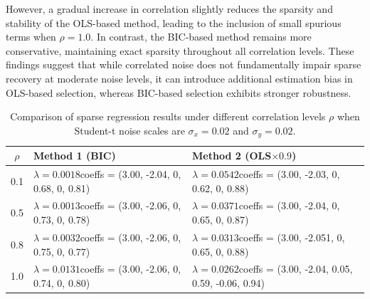 However, a gradual increase in correlation slightly reduces the sparsity and stability of the OLS-based method, leading to the inclusion of small spurious terms when $\rho=1.0$. In contrast, the BIC-based method remains more conservative, maintaining exact sparsity throughout all correlation levels. These findings suggest that while correlated noise does not fundamentally impair sparse recovery at moderate noise levels, it can introduce additional estimation bias in OLS-based selection, whereas BIC-based selection exhibits stronger robustness.

\begin{table}[htbp]
\centering
\caption{Comparison of sparse regression results under different correlation levels $\rho$ when Student-t noise scales are $\sigma_x=0.02$ and $\sigma_y=0.02$. }
\label{tab:sparse_rho}
\scriptsize
\begin{tabular}{c p{6cm} p{6cm}}
\toprule
$\rho$ & Method 1 (BIC) & Method 2 (OLS$\times 0.9$) \\
\midrule
0.1 & $\lambda=0.0018$\newline coeffs = (3.00, -2.04, 0, 0.68, 0, 0.81) 
    & $\lambda=0.0542$\newline coeffs = (3.00, -2.03, 0, 0.62, 0, 0.88) \\
\midrule
0.5 & $\lambda=0.0013$\newline coeffs = (3.00, -2.06, 0, 0.73, 0, 0.78) 
    & $\lambda=0.0371$\newline coeffs = (3.00, -2.04, 0, 0.65, 0, 0.87) \\
\midrule
0.8 & $\lambda=0.0032$\newline coeffs = (3.00, -2.06, 0, 0.75, 0, 0.77) 
    & $\lambda=0.0313$\newline coeffs = (3.00, -2.051, 0, 0.65, 0, 0.88) \\
\midrule
1.0 & $\lambda=0.0131$\newline coeffs = (3.00, -2.06, 0, 0.74, 0, 0.80) 
    & $\lambda=0.0262$\newline coeffs = (3.00, -2.04, 0.05, 0.59, -0.06, 0.94) \\
\bottomrule
\end{tabular}
\end{table}



















